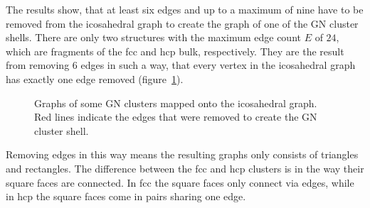 The results show, that at least six edges and up to a maximum of nine have to
be removed from the icosahedral graph to create the graph of one of the \ac{GN}
cluster shells. There are only two structures with the maximum edge count $E$
of $24$, which are fragments of the \ac{fcc} and hcp bulk, respectively. They are
the result from removing 6 edges in such a way, that every vertex in the
icosahedral graph has exactly one edge removed (figure~\ref{fig:GNshellgraphs}).

\begin{figure}
    \centering
    \hspace{0.03\textwidth}
    \hspace{0.03\textwidth}
    \caption{Graphs of some \acs{GN} clusters mapped onto the icosahedral graph.
    Red lines indicate the edges that were removed to create the \acs{GN}
    cluster shell.}
    \label{fig:GNshellgraphs}
\end{figure}

Removing edges in this way means the resulting graphs only consists of
triangles and rectangles. The difference between the \ac{fcc} and hcp clusters
is in the way their square faces are connected. In \ac{fcc} the square faces
only connect via edges, while in hcp the square faces come in pairs sharing one
edge. 

